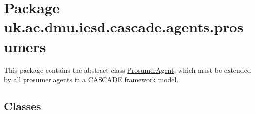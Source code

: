 \hypertarget{namespaceuk_1_1ac_1_1dmu_1_1iesd_1_1cascade_1_1agents_1_1prosumers}{\section{Package uk.\-ac.\-dmu.\-iesd.\-cascade.\-agents.\-prosumers}
\label{namespaceuk_1_1ac_1_1dmu_1_1iesd_1_1cascade_1_1agents_1_1prosumers}
}


This package contains the abstract class \hyperlink{classuk_1_1ac_1_1dmu_1_1iesd_1_1cascade_1_1agents_1_1prosumers_1_1_prosumer_agent}{Prosumer\-Agent}, which must be extended by all prosumer agents in a C\-A\-S\-C\-A\-D\-E framework model.  


\subsection*{Classes}
